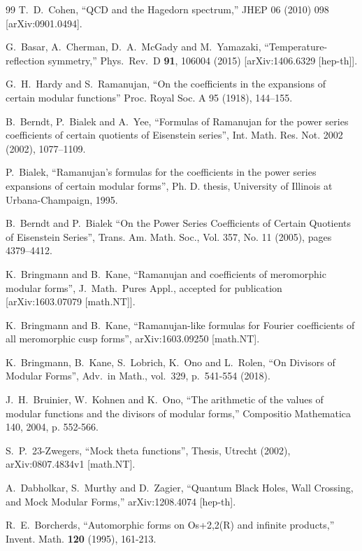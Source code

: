 \documentclass[11pt,a4paper]{article}
\begin{document}
\begin{thebibliography}{99}
T.~D.~Cohen, 
``QCD and the Hagedorn spectrum,'' 
JHEP 06 (2010) 098 
[arXiv:0901.0494].


G.~Basar, A.~Cherman, D.~A.~McGady and M.~Yamazaki,
``Temperature-reflection symmetry,''
Phys.\ Rev.\ D {\bf 91}, 106004 (2015)
[arXiv:1406.6329 [hep-th]].


G.~H.~Hardy and S.~Ramanujan,
``On the coefficients in the expansions of certain modular functions''
Proc. Royal Soc. A 95 (1918), 144--155.


B.~Berndt, P.~Bialek and A.~Yee, 
``Formulas of Ramanujan for the power series coefficients of certain quotients of Eisenstein series'', 
Int. Math. Res. Not. 2002 (2002), 1077--1109.


P.~Bialek, 
``Ramanujan's formulas for the coefficients in the power series expansions of certain modular forms'',
Ph. D. thesis, University of Illinois at Urbana-Champaign, 1995.


B.~Berndt and P.~Bialek
``On the Power Series Coefficients of Certain Quotients of Eisenstein Series'',
Trans. Am. Math. Soc.,
Vol. 357, No. 11 (2005), pages 4379--4412.


K.~Bringmann and B.~Kane,
``Ramanujan and coefficients of meromorphic modular forms'',
J.~Math.~Pures Appl., accepted for publication
[arXiv:1603.07079 [math.NT]].


K.~Bringmann and B.~Kane,
``Ramanujan-like formulas for Fourier coefficients of all meromorphic cusp forms'',
arXiv:1603.09250 [math.NT].


K.~Bringmann, B.~Kane, S.~Lobrich, K.~Ono and L.~Rolen,
``On Divisors of Modular Forms'',
Adv.~in Math., vol.~329, p.~541-554 (2018).


J.~H.~Bruinier, W.~Kohnen and K.~Ono,
``The arithmetic of the values of modular functions and the divisors of modular forms,'' 
Compositio Mathematica 140, 2004, p. 552-566.


S.~P.~23-Zwegers, 
``Mock theta functions'', 
Thesis, Utrecht (2002),  
arXiv:0807.4834v1 [math.NT].


A.~Dabholkar, S.~Murthy and D.~Zagier,
``Quantum Black Holes, Wall Crossing, and Mock Modular Forms,''
arXiv:1208.4074 [hep-th].


R.~E.~Borcherds, 
``Automorphic forms on Os+2,2(R) and infinite products,'' 
Invent. Math. {\bf 120} (1995), 161-213.



\end{thebibliography}
\end{document}

